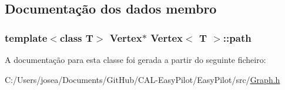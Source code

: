 \subsection{Documentação dos dados membro}
\hypertarget{class_vertex_abd40febd917aa25add6bd42237c8463a}{}
\subsubsection[{path}]{\setlength{\rightskip}{0pt plus 5cm}template$<$class T$>$ {\bf Vertex}$\ast$ {\bf Vertex}$<$ T $>$\+::path}\label{class_vertex_abd40febd917aa25add6bd42237c8463a}


A documentação para esta classe foi gerada a partir do seguinte ficheiro\+:\begin{DoxyCompactItemize}
\item 
C\+:/\+Users/josea/\+Documents/\+Git\+Hub/\+C\+A\+L-\/\+Easy\+Pilot/\+Easy\+Pilot/src/\hyperlink{_graph_8h}{Graph.\+h}\end{DoxyCompactItemize}
